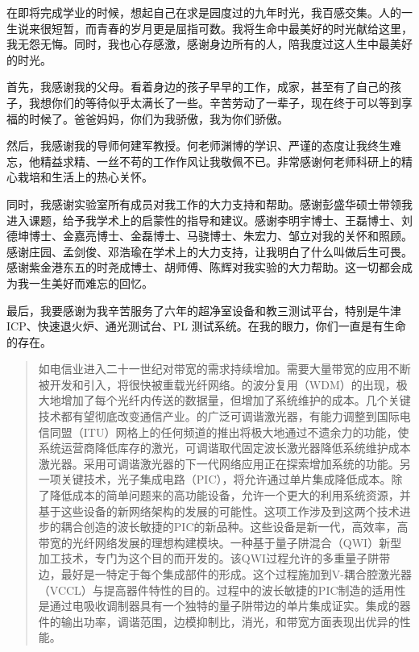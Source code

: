 \documentclass{ZJUthesis}
\begin{document}
\begin{thanks}
在即将完成学业的时候，想起自己在求是园度过的九年时光，我百感交集。人的一生说来很短暂，而青春的岁月更是屈指可数。我将生命中最美好的时光献给这里，我无怨无悔。同时，我也心存感激，感谢身边所有的人，陪我度过这人生中最美好的时光。

首先，我感谢我的父母。看着身边的孩子早早的工作，成家，甚至有了自己的孩子，我想你们的等待似乎太满长了一些。辛苦劳动了一辈子，现在终于可以等到享福的时候了。爸爸妈妈，你们为我骄傲，我为你们骄傲。

然后，我感谢我的导师何建军教授。何老师渊博的学识、严谨的态度让我终生难忘，他精益求精、一丝不苟的工作作风让我敬佩不已。非常感谢何老师科研上的精心栽培和生活上的热心关怀。

同时，我感谢实验室所有成员对我工作的大力支持和帮助。感谢彭盛华硕士带领我进入课题，给予我学术上的启蒙性的指导和建议。感谢李明宇博士、王磊博士、刘德坤博士、金嘉亮博士、金磊博士、马骁博士、朱宏力、邹立对我的关怀和照顾。感谢庄园、孟剑俊、邓浩瑜在学术上的大力支持，让我明白了什么叫做后生可畏。感谢紫金港东五的时尧成博士、胡师傅、陈辉对我实验的大力帮助。这一切都会成为我一生美好而难忘的回忆。

最后，我要感谢为我辛苦服务了六年的超净室设备和教三测试平台，特别是牛津ICP、快速退火炉、通光测试台、PL 测试系统。在我的眼力，你们一直是有生命的存在。
\end{thanks}

\begin{abstract}
如电信业进入二十一世纪对带宽的需求持续增加。需要大量带宽的应用不断被开发和引入，将很快被重载光纤网络。的波分复用（WDM）的出现，极大地增加了每个光纤内传送的数据量，但增加了系统维护的成本。几个关键技术都有望彻底改变通信产业。的广泛可调谐激光器，有能力调整到国际电信同盟（ITU）网格上的任何频道的推出将极大地通过不遗余力的功能，使系统运营商降低库存的激光，可调谐取代固定波长激光器降低系统维护成本激光器。采用可调谐激光器的下一代网络应用正在探索增加系统的功能。另一项关键技术，光子集成电路（PIC），将允许通过单片集成降低成本。除了降低成本的简单问题来的高功能设备，允许一个更大的利用系统资源，并基于这些设备的新网络架构的发展的可能性。这项工作涉及到这两个技术进步的耦合创造的波长敏捷的PIC的新品种。这些设备是新一代，高效率，高带宽的光纤网络发展的理想构建模块。一种基于量子阱混合（QWI）新型加工技术，专门为这个目的而开发的。该QWI过程允许的多重量子阱带边，最好是一特定于每个集成部件的形成。这个过程施加到V-耦合腔激光器（VCCL）与提高器件特性的目的。过程中的波长敏捷的PIC制造的适用性是通过电吸收调制器具有一个独特的量子阱带边的单片集成证实。集成的器件的输出功率，调谐范围，边模抑制比，消光，和带宽方面表现出优异的性能。

\end{abstract}
\end{document}
